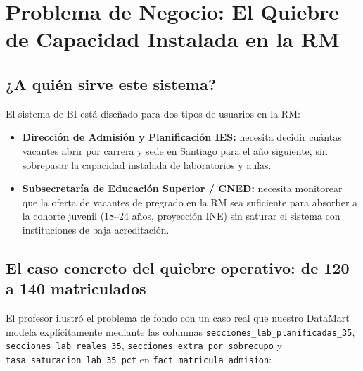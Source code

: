 \documentclass[11pt,a4paper]{article}
\begin{document}
\section{Problema de Negocio: El Quiebre de Capacidad Instalada en la RM}
\label{sec:problema}

\subsection{¿A quién sirve este sistema?}

El sistema de BI está diseñado para dos tipos de usuarios en la RM:

\begin{itemize}[leftmargin=*]
    \item \textbf{Dirección de Admisión y Planificación IES:} necesita decidir
          cuántas vacantes abrir por carrera y sede en Santiago para el año siguiente,
          sin sobrepasar la capacidad instalada de laboratorios y aulas.
    \item \textbf{Subsecretaría de Educación Superior / CNED:}
          necesita monitorear que la oferta de vacantes de pregrado en la RM sea
          suficiente para absorber a la cohorte juvenil (18--24 años, proyección INE)
          sin saturar el sistema con instituciones de baja acreditación.
\end{itemize}

\subsection{El caso concreto del quiebre operativo: de 120 a 140 matriculados}
\label{subsec:caso120}

El profesor ilustró el problema de fondo con un caso real que nuestro DataMart
modela explícitamente mediante las columnas \texttt{secciones\_lab\_planificadas\_35},
\texttt{secciones\_lab\_reales\_35}, \texttt{secciones\_extra\_por\_sobrecupo} y
\texttt{tasa\_saturacion\_lab\_35\_pct} en \texttt{fact\_matricula\_admision}:
\end{document}
